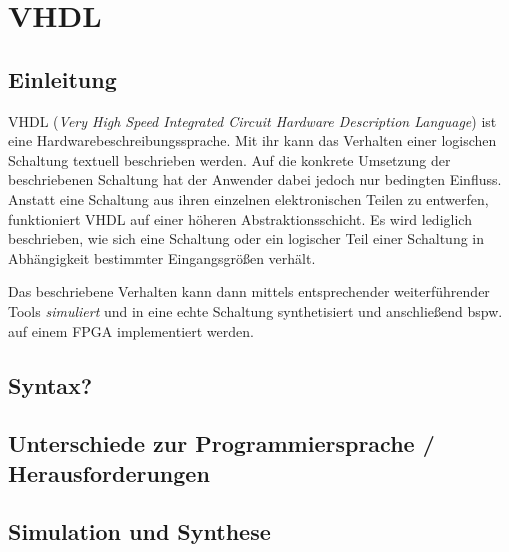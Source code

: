 \chapter{VHDL} %
\label{VHDL} %

\section{Einleitung}
VHDL (\textit{Very High Speed Integrated Circuit Hardware Description Language}) ist eine Hardwarebeschreibungssprache. Mit ihr kann das Verhalten einer logischen Schaltung textuell beschrieben werden. Auf die konkrete Umsetzung der beschriebenen Schaltung hat der Anwender dabei jedoch nur bedingten Einfluss. Anstatt eine Schaltung aus ihren einzelnen elektronischen Teilen zu entwerfen, funktioniert VHDL auf einer höheren Abstraktionsschicht. Es wird lediglich beschrieben, wie sich eine Schaltung oder ein logischer Teil einer Schaltung in Abhängigkeit bestimmter Eingangsgrößen verhält.

Das beschriebene Verhalten kann dann mittels entsprechender weiterführender Tools \textit{simuliert} und in eine echte Schaltung synthetisiert und anschließend bspw. auf einem FPGA implementiert werden.

\section{Syntax?}

\section{Unterschiede zur Programmiersprache / Herausforderungen}

\section{Simulation und Synthese}
